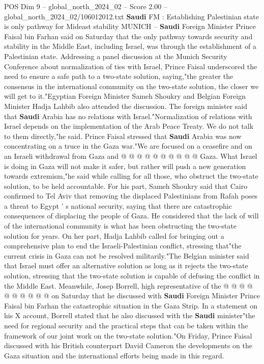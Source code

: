 \begin{textsample}{POS Dim 9 – global\_north\_2024\_02 – Score 2.00 – global\_north\_2024\_02/106012012.txt}  \label{ex:f9_pos_164}
\textbf{Saudi} FM : Establishing Palestinian state is only pathway for Mideast stability MUNICH -- \textbf{Saudi} Foreign Minister Prince Faisal bin Farhan said on Saturday that the only pathway towards security and stability in the Middle East, including Israel, was through the establishment of a Palestinian state.
Addressing a panel discussion at the Munich Security Conference about normalization of ties with Israel, Prince Faisal underscored the need to ensure a safe path to a two-state solution, saying,"the greater the consensus in the international community on the two-state solution, the closer we will get to it."Egyptian Foreign Minister Sameh Shoukry and Belgian Foreign Minister Hadja Lahbib also attended the discussion.
The foreign minister said that \textbf{Saudi} Arabia has no relations with Israel."Normalization of relations with Israel depends on the implementation of the Arab Peace Treaty.
We do not talk to them directly,"he said.
Prince Faisal stressed that \textbf{Saudi} Arabia was now concentrating on a truce in the Gaza war."We are focused on a ceasefire and on an Israeli withdrawal from Gaza and @ @ @ @ @ @ @ @ @ @ Gaza.
What Israel is doing in Gaza will not make it safer, but rather will push a new generation towards extremism,"he said while calling for all those, who obstruct the two-state solution, to be held accountable.
For his part, Sameh Shoukry said that Cairo confirmed to Tel Aviv that removing the displaced Palestinians from Rafah poses a threat to Egypt ' s national security, saying that there are catastrophic consequences of displacing the people of Gaza.
He considered that the lack of will of the international community is what has been obstructing the two-state solution for years.
On her part, Hadja Lahbib called for bringing out a comprehensive plan to end the Israeli-Palestinian conflict, stressing that"the current crisis in Gaza can not be resolved militarily."The Belgian minister said that Israel must offer an alternative solution as long as it rejects the two-state solution, stressing that the two-state solution is capable of defusing the conflict in the Middle East.
Meanwhile, Josep Borrell, high representative of the @ @ @ @ @ @ @ @ @ @ on Saturday that he discussed with \textbf{Saudi} Foreign Minister Prince Faisal bin Farhan the catastrophic situation in the Gaza Strip.
In a statement on his X account, Borrell stated that he also discussed with the \textbf{Saudi} minister"the need for regional security and the practical steps that can be taken within the framework of our joint work on the two-state solution."On Friday, Prince Faisal discussed with his British counterpart David Cameron the developments on the Gaza situation and the international efforts being made in this regard.

\end{textsample}
